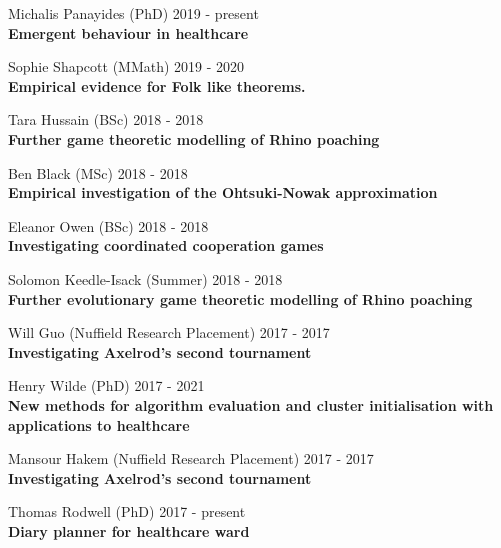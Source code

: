 \documentclass[10pt]{res} %
\begin{document}
\begin{resume}
\begin{etaremune}
\item
    Michalis Panayides (PhD) \hfill 2019 -
    present\\
\textbf{Emergent behaviour in healthcare}\\

\item
    Sophie Shapcott (MMath) \hfill 2019 -
    2020\\
\textbf{Empirical evidence for Folk like theorems.}\\

\item
    Tara Hussain (BSc) \hfill 2018 -
    2018\\
\textbf{Further game theoretic modelling of Rhino poaching}\\

\item
    Ben Black (MSc) \hfill 2018 -
    2018\\
\textbf{Empirical investigation of the Ohtsuki-Nowak approximation}\\

\item
    Eleanor Owen (BSc) \hfill 2018 -
    2018\\
\textbf{Investigating coordinated cooperation games}\\

\item
    Solomon Keedle-Isack (Summer) \hfill 2018 -
    2018\\
\textbf{Further evolutionary game theoretic modelling of Rhino poaching}\\

\item
    Will Guo (Nuffield Research Placement) \hfill 2017 -
    2017\\
\textbf{Investigating Axelrod's second tournament}\\

\item
    Henry Wilde (PhD) \hfill 2017 -
    2021\\
\textbf{New methods for algorithm evaluation and cluster initialisation with applications to healthcare}\\

\item
    Mansour Hakem (Nuffield Research Placement) \hfill 2017 -
    2017\\
\textbf{Investigating Axelrod's second tournament}\\

\item
    Thomas Rodwell (PhD) \hfill 2017 -
    present\\
\textbf{Diary planner for healthcare ward}\\


\end{etaremune}
\end{resume}
\end{document}

